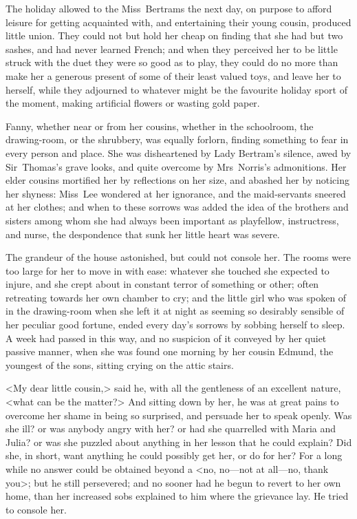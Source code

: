The holiday allowed to the Miss~Bertrams the next day, on purpose to afford leisure for getting acquainted with, and entertaining their young cousin, produced little union. They could not but hold her cheap on finding that she had but two sashes, and had never learned French; and when they perceived her to be little struck with the duet they were so good as to play, they could do no more than make her a generous present of some of their least valued toys, and leave her to herself, while they adjourned to whatever might be the favourite holiday sport of the moment, making artificial flowers or wasting gold paper.

Fanny, whether near or from her cousins, whether in the schoolroom, the drawing-room, or the shrubbery, was equally forlorn, finding something to fear in every person and place. She was disheartened by Lady Bertram's silence, awed by Sir~Thomas's grave looks, and quite overcome by Mrs~Norris's admonitions. Her elder cousins mortified her by reflections on her size, and abashed her by noticing her shyness: Miss~Lee wondered at her ignorance, and the maid-servants sneered at her clothes; and when to these sorrows was added the idea of the brothers and sisters among whom she had always been important as playfellow, instructress, and nurse, the despondence that sunk her little heart was severe.

The grandeur of the house astonished, but could not console her. The rooms were too large for her to move in with ease: whatever she touched she expected to injure, and she crept about in constant terror of something or other; often retreating towards her own chamber to cry; and the little girl who was spoken of in the drawing-room when she left it at night as seeming so desirably sensible of her peculiar good fortune, ended every day's sorrows by sobbing herself to sleep. A week had passed in this way, and no suspicion of it conveyed by her quiet passive manner, when she was found one morning by her cousin Edmund, the youngest of the sons, sitting crying on the attic stairs.

<My dear little cousin,> said he, with all the gentleness of an excellent nature, <what can be the matter?> And sitting down by her, he was at great pains to overcome her shame in being so surprised, and persuade her to speak openly. Was she ill? or was anybody angry with her? or had she quarrelled with Maria and Julia? or was she puzzled about anything in her lesson that he could explain? Did she, in short, want anything he could possibly get her, or do for her? For a long while no answer could be obtained beyond a <no, no—not at all—no, thank you>; but he still persevered; and no sooner had he begun to revert to her own home, than her increased sobs explained to him where the grievance lay. He tried to console her.

